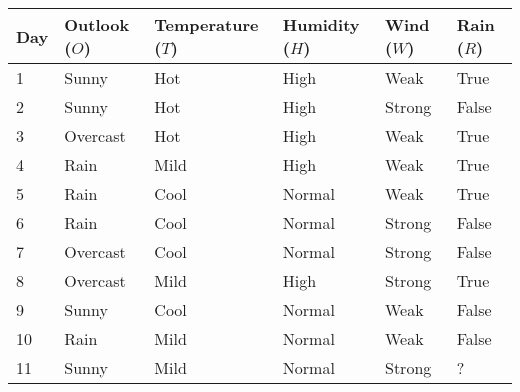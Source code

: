 \documentclass[aspectratio=169, 10pt]{beamer}
\begin{document}
\begin{frame}[t]
    \begin{table}[]
        \small
        \begin{tabular}{l|llll|l}
        \textbf{Day} & \textbf{Outlook} ($O$) & \textbf{Temperature} ($T$) & \textbf{Humidity} ($H$) & \textbf{Wind} ($W$) & \textbf{Rain} ($R$) \\ \hline
        1            & Sunny            & Hot                  & High              & Weak          & True           \\
        2            & Sunny            & Hot                  & High              & Strong        & False            \\
        3            & Overcast         & Hot                  & High              & Weak          & True           \\
        4            & Rain             & Mild                 & High              & Weak          & True           \\
        5            & Rain             & Cool                 & Normal            & Weak          & True           \\
        6            & Rain             & Cool                 & Normal            & Strong        & False            \\
        7            & Overcast         & Cool                 & Normal            & Strong        & False            \\
        8            & Overcast         & Mild                 & High              & Strong        & True           \\
        9            & Sunny            & Cool                 & Normal            & Weak          & False            \\
        10           & Rain             & Mild                 & Normal            & Weak          & False            \\ \hline
        11           & Sunny            & Mild                 & Normal            & Strong        & ?            
        \end{tabular}
    \end{table}

\end{frame}
\end{document}
